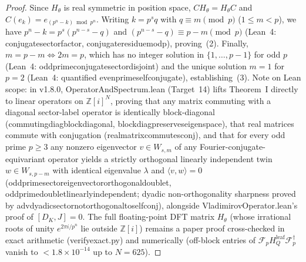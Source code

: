 \documentclass[11pt,a4paper]{article}
\numberwithin{equation}{section}
\theoremstyle{plain}
\theoremstyle{definition}
\theoremstyle{remark}
\newcommand{\Z}{\mathbb{Z}}
\newcommand{\code}[1]{{\ttfamily\footnotesize\def\_{\textunderscore\penalty0\hskip0pt}#1}}
\begin{document}
\begin{proof}
Since $H_\theta$ is real symmetric in position space, $C H_\theta = H_\theta C$ and $C(e_k) = e_{(p^n - k)\bmod p^n}$. Writing $k = p^s q$ with $q \equiv m \pmod{p}$ ($1 \le m < p$), we have $p^n - k = p^s(p^{n-s} - q)$ and $(p^{n-s} - q) \equiv p - m \pmod{p}$ (Lean~4: \code{conjugate\_sector\_factor}, \code{conjugate\_residue\_mod\_p}), proving~(2). Finally, $m = p - m \iff 2m = p$, which has no integer solution in $\{1,\dots,p-1\}$ for odd $p$ (Lean~4: \code{odd\_prime\_conjugate\_sector\_disjoint}) and the unique solution $m = 1$ for $p = 2$ (Lean~4: quantified \code{even\_prime\_self\_conjugate}), establishing~(3). Note on Lean scope: in \code{v1.8.0}, \code{OperatorAndSpectrum.lean} (Target~14) lifts Theorem~I directly to linear operators on $\Z[i]^N$, proving that any matrix commuting with a diagonal sector-label operator is identically block-diagonal (\code{commuting\_\allowbreak diag\_\allowbreak block\_\allowbreak diagonal}, \code{block\_\allowbreak diag\_\allowbreak preserves\_\allowbreak eigenspace}), that real matrices commute with conjugation (\code{real\_\allowbreak matrix\_\allowbreak commutes\_\allowbreak conj}), and that for every odd prime $p \ge 3$ any nonzero eigenvector $v \in W_{s,m}$ of any Fourier-conjugate-equivariant operator yields a strictly orthogonal linearly independent twin $w \in W_{s,p-m}$ with identical eigenvalue $\lambda$ and $\langle v, w \rangle = 0$ (\code{odd\_\allowbreak prime\_\allowbreak sector\_\allowbreak eigenvector\_\allowbreak orthogonal\_\allowbreak doublet}, \code{odd\_\allowbreak prime\_\allowbreak doublet\_\allowbreak linearly\_\allowbreak independent}; dyadic non-orthogonality sharpness proved by \code{adv\_\allowbreak dyadic\_\allowbreak sector\_\allowbreak not\_\allowbreak orthogonal\_\allowbreak to\_\allowbreak self\_\allowbreak conj}), alongside \code{VladimirovOperator.lean}'s proof of $[D_K, J] = 0$. The full floating-point DFT matrix $H_\theta$ (whose irrational roots of unity $e^{2\pi i/p^n}$ lie outside $\Z[i]$) remains a paper proof cross-checked in exact arithmetic (\code{verify\_exact.py}) and numerically (off-block entries of $\mathcal{F}_p H_Q^{\mathrm{leaf}} \mathcal{F}_p^\dagger$ vanish to $< 1.8\times 10^{-14}$ up to $N = 625$).
\end{proof}
\end{document}
